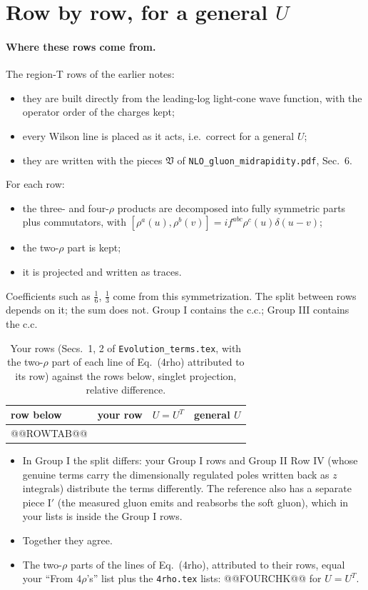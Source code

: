 \documentclass[10pt]{article}
\numberwithin{equation}{section}
\begin{document}
\section{Row by row, for a general \texorpdfstring{$U$}{U}}\label{sec:rows}
\paragraph{Where these rows come from.} The region-T rows of the earlier notes:
\begin{itemize}
\item they are built directly from the leading-log light-cone wave function, with the operator order of the charges kept;
\item every Wilson line is placed as it acts, i.e.\ correct for a general $U$;
\item they are written with the pieces $\mathfrak V$ of \texttt{NLO\_gluon\_midrapidity.pdf}, Sec.~6.
\end{itemize}
For each row:
\begin{itemize}
\item the three- and four-$\rho$ products are decomposed into fully symmetric parts plus commutators, with $[\rho^a(u),\rho^b(v)]=if^{abc}\rho^c(u)\delta(u-v)$;
\item the two-$\rho$ part is kept;
\item it is projected and written as traces.
\end{itemize}
Coefficients such as $\frac16$, $\frac13$ come from this symmetrization. The split between rows depends on it; the sum does not. Group I contains the c.c.; Group III contains the c.c.

\begin{table}[H]\centering\small
\caption{Your rows (Secs.~1, 2 of \texttt{Evolution\_terms.tex}, with the two-$\rho$ part of each line of Eq.~(4rho) attributed to its row) against the rows below, singlet projection, relative difference.}\label{tab:rows}
\begin{tabular}{@{}llcc@{}}\toprule
row below & your row & $U=U^T$ & general $U$\\\midrule
@@ROWTAB@@
\bottomrule
\end{tabular}
\end{table}
\begin{itemize}
\item In Group I the split differs: your Group I rows and Group II Row IV (whose genuine terms carry the dimensionally regulated poles written back as $z$ integrals) distribute the terms differently. The reference also has a separate piece I$'$ (the measured gluon emits and reabsorbs the soft gluon), which in your lists is inside the Group I rows.
\item Together they agree.
\item The two-$\rho$ parts of the lines of Eq.~(4rho), attributed to their rows, equal your ``From $4\rho$'s'' list plus the \texttt{4rho.tex} lists: @@FOURCHK@@ for $U=U^T$.
\end{itemize}
\end{document}
